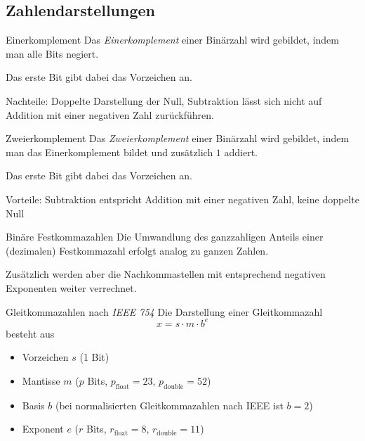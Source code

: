 \newpage
\subsection{Zahlendarstellungen}

\begin{defi}{Einerkomplement}
    Das \emph{Einerkomplement} einer Binärzahl wird gebildet, indem man alle Bits negiert.

    Das erste Bit gibt dabei das Vorzeichen an.

    Nachteile: Doppelte Darstellung der Null, Subtraktion lässt sich nicht auf Addition mit einer negativen Zahl zurückführen.
\end{defi}

\begin{defi}{Zweierkomplement}
    Das \emph{Zweierkomplement} einer Binärzahl wird gebildet, indem man das Einerkomplement bildet und zusätzlich $1$ addiert.

    Das erste Bit gibt dabei das Vorzeichen an.

    Vorteile: Subtraktion entspricht Addition mit einer negativen Zahl, keine doppelte Null
\end{defi}

\begin{defi}{Binäre Festkommazahlen}
    Die Umwandlung des ganzzahligen Anteils einer (dezimalen) Festkommazahl erfolgt analog zu ganzen Zahlen.

    Zusätzlich werden aber die Nachkommastellen mit entsprechend negativen Exponenten weiter \glqq verrechnet\grqq.
\end{defi}

\begin{defi}{Gleitkommazahlen nach \emph{IEEE 754}}
    Die Darstellung einer Gleitkommazahl
    $$
        x = s \cdot m \cdot b^e
    $$
    besteht aus
    \begin{itemize}
        \item Vorzeichen $s$ (1 Bit)
        \item Mantisse $m$ ($p$ Bits, $p_{\text{float}} = 23$, $p_{\text{double}} = 52$)
        \item Basis $b$ (bei normalisierten Gleitkommazahlen nach IEEE ist $b = 2$)
        \item Exponent $e$ ($r$ Bits, $r_{\text{float}} = 8$, $r_{\text{double}} = 11$)
    \end{itemize}
\end{defi}

